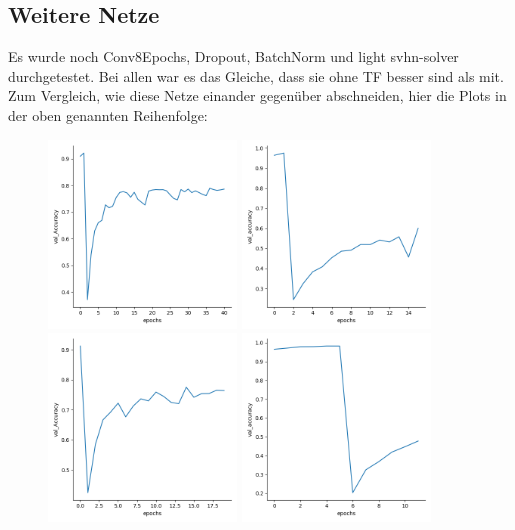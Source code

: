 \subsection{Weitere Netze}
    Es wurde noch Conv8Epochs, Dropout, BatchNorm und light svhn-solver durchgetestet. 
    Bei allen war es das Gleiche, dass sie ohne TF besser sind als mit. Zum Vergleich, wie 
    diese Netze einander gegenüber abschneiden, hier die Plots in der oben genannten Reihenfolge: 
    \begin{figure}[htpb]
        \includegraphics[height=5cm]{../Plots/models_03_C8E/val_Accuracy.png}
        \includegraphics[height=5cm]{../Plots/models_02_DrO/val_Accuracy.png}
        \includegraphics[height=5cm]{../Plots/models_02_BtN/val_Accuracy.png}
        \includegraphics[height=5cm]{../Plots/models_01_Sce/val_Accuracy.png}
    \end{figure}

